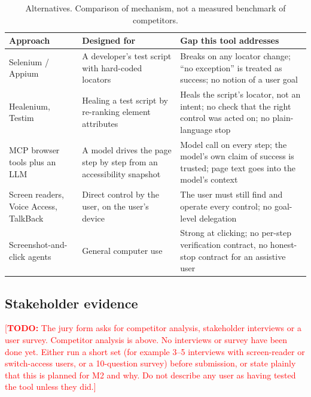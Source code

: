 \documentclass[11pt,a4paper]{article}
\newcommand{\todo}[1]{\textcolor{red}{[\textbf{TODO:} #1]}}
\begin{document}
\begin{table}[h]\centering\small
\begin{tabularx}{\textwidth}{@{}l X X@{}}
\toprule
Approach & Designed for & Gap this tool addresses\\\midrule
Selenium / Appium & A developer's test script with hard-coded locators & Breaks on any locator change; ``no exception'' is treated as success; no notion of a user goal\\
Healenium, Testim & Healing a test script by re-ranking element attributes & Heals the script's locator, not an intent; no check that the right control was acted on; no plain-language stop\\
MCP browser tools plus an LLM & A model drives the page step by step from an accessibility snapshot & Model call on every step; the model's own claim of success is trusted; page text goes into the model's context\\
Screen readers, Voice Access, TalkBack & Direct control by the user, on the user's device & The user must still find and operate every control; no goal-level delegation\\
Screenshot-and-click agents & General computer use & Strong at clicking; no per-step verification contract, no honest-stop contract for an assistive user\\
\bottomrule
\end{tabularx}
\caption{Alternatives. Comparison of mechanism, not a measured benchmark of competitors.}\label{tab:alt}
\end{table}

\subsection{Stakeholder evidence}
\todo{The jury form asks for competitor analysis, stakeholder interviews or a user survey. Competitor analysis is above. No interviews or survey have been done yet. Either run a short set (for example 3--5 interviews with screen-reader or switch-access users, or a 10-question survey) before submission, or state plainly that this is planned for M2 and why. Do not describe any user as having tested the tool unless they did.}

\end{document}
